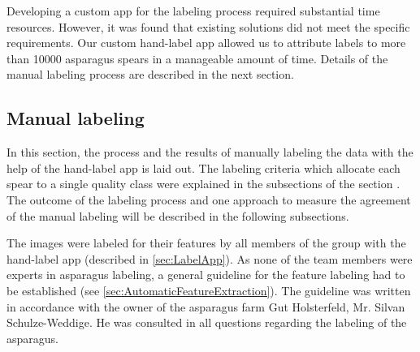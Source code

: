 \bigskip
Developing a custom app for the labeling process required substantial time resources. However, it was found that existing solutions did not meet the specific requirements. Our custom hand-label app allowed us to attribute labels to more than 10000 asparagus spears in a manageable amount of time. Details of the manual labeling process are described in the next section.


\subsection{Manual labeling}
\label{sec:ManualLabeling}

In this section, the process and the results of manually labeling the data with the help of the hand-label app is laid out. The labeling criteria which allocate each spear to a single quality class were explained in the subsections of the section . The outcome of the labeling process and one approach to measure the agreement of the manual labeling will be described in the following subsections.

\bigskip
The images were labeled for their features by all members of the group with the hand-label app (described in \autoref{sec:LabelApp}). As none of the team members were experts in asparagus labeling, a general guideline for the feature labeling had to be established (see \autoref{sec:AutomaticFeatureExtraction}). The guideline was written in accordance with the owner of the asparagus farm Gut Holsterfeld, Mr. Silvan Schulze-Weddige. He was consulted in all questions regarding the labeling of the asparagus.

